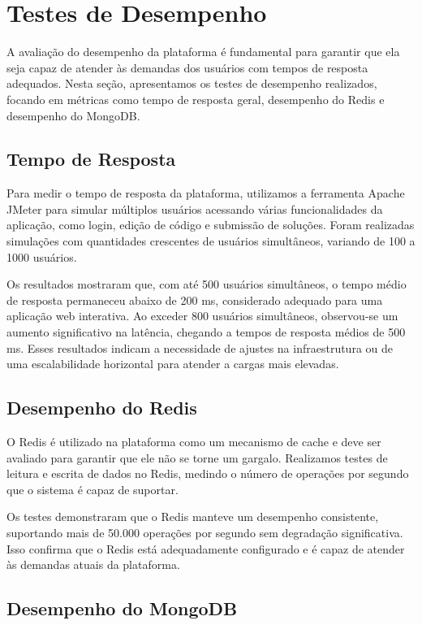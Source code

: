 \section{Testes de Desempenho}

A avaliação do desempenho da plataforma é fundamental para garantir que ela seja capaz de atender às demandas dos usuários com tempos de resposta adequados. Nesta seção, apresentamos os testes de desempenho realizados, focando em métricas como tempo de resposta geral, desempenho do Redis e desempenho do MongoDB.

\subsection{Tempo de Resposta}

Para medir o tempo de resposta da plataforma, utilizamos a ferramenta Apache JMeter para simular múltiplos usuários acessando várias funcionalidades da aplicação, como login, edição de código e submissão de soluções. Foram realizadas simulações com quantidades crescentes de usuários simultâneos, variando de 100 a 1000 usuários.

Os resultados mostraram que, com até 500 usuários simultâneos, o tempo médio de resposta permaneceu abaixo de 200 ms, considerado adequado para uma aplicação web interativa. Ao exceder 800 usuários simultâneos, observou-se um aumento significativo na latência, chegando a tempos de resposta médios de 500 ms. Esses resultados indicam a necessidade de ajustes na infraestrutura ou de uma escalabilidade horizontal para atender a cargas mais elevadas.

\subsection{Desempenho do Redis}

O Redis é utilizado na plataforma como um mecanismo de cache e deve ser avaliado para garantir que ele não se torne um gargalo. Realizamos testes de leitura e escrita de dados no Redis, medindo o número de operações por segundo que o sistema é capaz de suportar.

Os testes demonstraram que o Redis manteve um desempenho consistente, suportando mais de 50.000 operações por segundo sem degradação significativa. Isso confirma que o Redis está adequadamente configurado e é capaz de atender às demandas atuais da plataforma.

\subsection{Desempenho do MongoDB}

